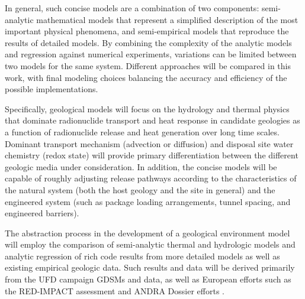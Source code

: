 In general, such concise models are a combination of two components: 
semi-analytic mathematical models that represent a simplified description of the 
most important physical phenomena, and semi-empirical models that reproduce the 
results of detailed models.  By combining the complexity of the analytic models 
and regression against numerical experiments, variations can be limited between 
two models for the same system.  Different approaches will be compared in this 
work, with final modeling choices balancing the accuracy and efficiency of the 
possible implementations.  


Specifically, geological models will focus on the hydrology and thermal 
physics that dominate radionuclide transport and heat response in candidate 
geologies as a function of radionuclide release and heat generation over long 
time scales. Dominant transport mechanism (advection or 
diffusion) and disposal site water chemistry (redox state) will provide primary 
differentiation between the different geologic media under consideration. In 
addition, the concise models will be capable of roughly adjusting release 
pathways according to the characteristics of the natural system (both the host 
geology and the site in general) and the engineered system (such as package 
loading arrangements, tunnel spacing, and engineered barriers).


The abstraction process in the development of a geological environment model 
will employ the comparison of semi-analytic thermal and hydrologic models and 
analytic regression of rich code results from more detailed models as well as 
existing empirical geologic data. Such results and data will be derived 
primarily from the \gls{UFD} campaign \glspl{GDSM} and data, as well as European 
efforts such as the RED-IMPACT assessment and \gls{ANDRA} Dossier efforts 
\cite{von_lensa_red-impact_2008, andra_argile:_2005, clayton_generic_2011} . 


%

